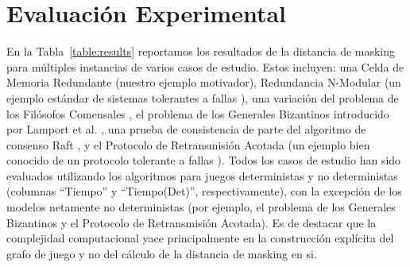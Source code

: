 \section{Evaluación Experimental}
\label{sec:experimental_eval_mask}


En la Tabla~\ref{table:results} reportamos los resultados de la distancia de masking para múltiples instancias de varios casos de estudio. Estos incluyen: una Celda de Memoria Redundante (nuestro ejemplo motivador), Redundancia N-Modular (un ejemplo estándar de sistemas tolerantes a fallas \cite{ShoomanBook}), una variación del problema de los Filósofos Comensales \cite{Dijkstra71}, el problema de los Generales Bizantinos introducido por Lamport et al. \cite{LamportSP82}, una prueba de consistencia de parte del algoritmo de consenso Raft \cite{OngaroO14}, y el Protocolo de Retransmisión Acotada (un ejemplo bien conocido de un protocolo tolerante a fallas \cite{GrooteP96}). Todos los casos de estudio han sido evaluados utilizando los algoritmos para juegos deterministas y no deterministas (columnas ``Tiempo'' y ``Tiempo(Det)'', respectivamente), con la excepción de los modelos netamente no deterministas (por ejemplo, el problema de los Generales Bizantinos y el Protocolo de Retransmisión Acotada). Es de destacar que la complejidad computacional yace principalmente en la construcción explícita del grafo de juego y no del cálculo de la distancia de masking en si.

